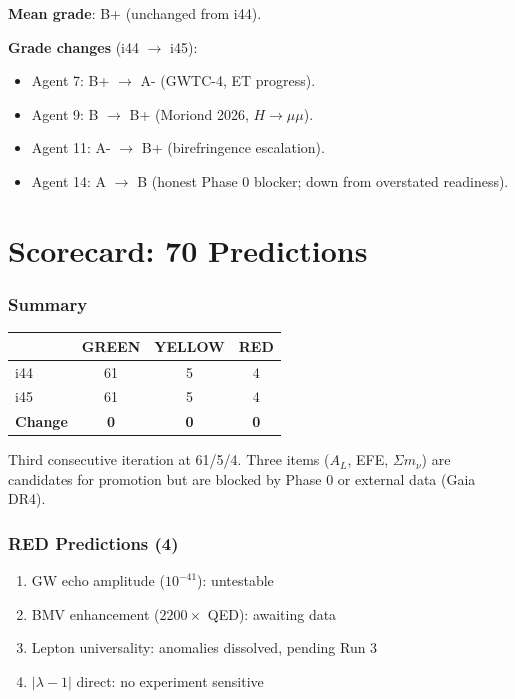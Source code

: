 \documentclass[11pt,a4paper]{article}
\newcommand{\GREEN}{\textcolor{dfdgreen}{\textbf{GREEN}}}
\newcommand{\YELLOW}{\textcolor{dfdyellow}{\textbf{YELLOW}}}
\newcommand{\RED}{\textcolor{dfdred}{\textbf{RED}}}
\begin{document}
\textbf{Mean grade}: B+ (unchanged from i44).

\textbf{Grade changes} (i44 $\to$ i45):
\begin{itemize}
\item Agent 7: B+ $\to$ A- (GWTC-4, ET progress).
\item Agent 9: B $\to$ B+ (Moriond 2026, $H \to \mu\mu$).
\item Agent 11: A- $\to$ B+ (birefringence escalation).
\item Agent 14: A $\to$ B (honest Phase 0 blocker; down from overstated readiness).
\end{itemize}


\part{Scorecard: 70 Predictions}

\section{Summary}

\begin{center}
\begin{tabular}{lccc}
\toprule
& \textbf{\GREEN} & \textbf{\YELLOW} & \textbf{\RED} \\
\midrule
i44 & 61 & 5 & 4 \\
i45 & 61 & 5 & 4 \\
\textbf{Change} & \textbf{0} & \textbf{0} & \textbf{0} \\
\bottomrule
\end{tabular}
\end{center}

Third consecutive iteration at 61/5/4. Three items ($A_L$, EFE, $\Sigma m_\nu$) are candidates for promotion but are blocked by Phase 0 or external data (Gaia DR4).

\section{RED Predictions (4)}

\begin{enumerate}
\item GW echo amplitude ($10^{-41}$): untestable
\item BMV enhancement ($2200\times$ QED): awaiting data
\item Lepton universality: anomalies dissolved, pending Run 3
\item $|\lambda-1|$ direct: no experiment sensitive
\end{enumerate}
\end{document}
